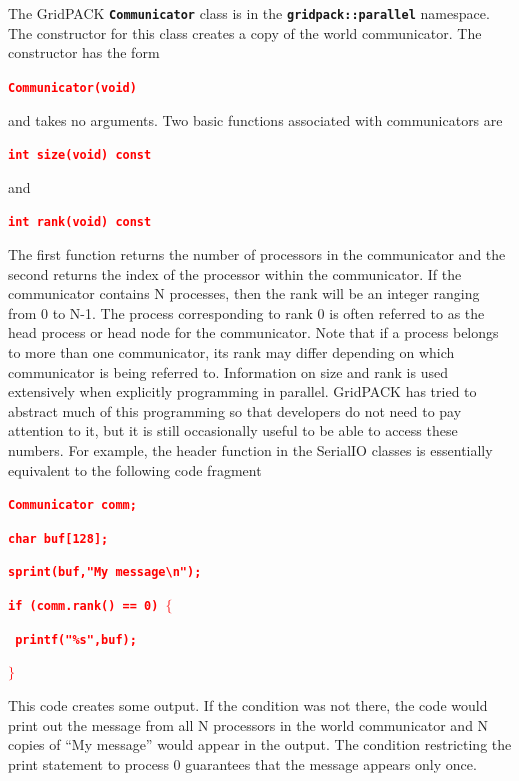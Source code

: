 \documentclass[12pt]{report} %
\begin{document}
The GridPACK \texttt{\textbf{Communicator}} class is in the \texttt{\textbf{gridpack::parallel}} namespace. The constructor for this class creates a copy of the world communicator. The constructor has the form

\textcolor{red}{\texttt{\textbf{Communicator(void)}}}

and takes no arguments. Two basic functions associated with communicators are

\textcolor{red}{\texttt{\textbf{int size(void) const}}}

and

\textcolor{red}{\texttt{\textbf{int rank(void) const}}}

The first function returns the number of processors in the communicator and the second returns the index of the processor within the communicator. If the communicator contains N processes, then the rank will be an integer ranging from 0 to N-1. The process corresponding to rank 0 is often referred to as the head process or head node for the communicator. Note that if a process belongs to more than one communicator, its rank may differ depending on which communicator is being referred to. Information on size and rank is used extensively when explicitly programming in parallel. GridPACK has tried to abstract much of this programming so that developers do not need to pay attention to it, but it is still occasionally useful to be able to access these numbers. For example, the header function in the SerialIO classes is essentially equivalent to the following code fragment

\textcolor{red}{\texttt{\textbf{Communicator comm;}}}

\textcolor{red}{\texttt{\textbf{char buf[128];}}}

\textcolor{red}{\texttt{\textbf{sprint(buf,"My message{\textbackslash}n");}}}

\textcolor{red}{\texttt{\textbf{if (comm.rank() == 0) $\boldsymbol{\mathrm{\{}}$}}}

\textcolor{red}{\texttt{\textbf{  printf("\%s",buf);}}}

\textcolor{red}{\texttt{\textbf{$\boldsymbol{\mathrm{\}}}$}}}

This code creates some output. If the condition was not there, the code would print out the message from all N processors in the world communicator and N copies of ``My message'' would appear in the output. The condition restricting the print statement to process 0 guarantees that the message appears only once.
\end{document}

